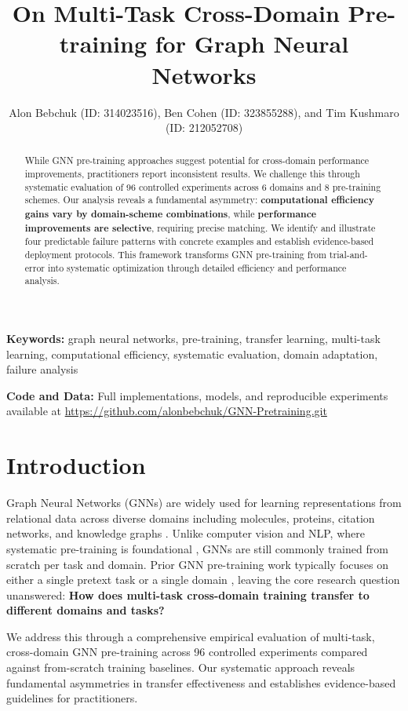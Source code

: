 \documentclass[11pt]{article}
\title{On Multi-Task Cross-Domain Pre-training for Graph Neural Networks}
\author{
  Alon Bebchuk (ID: 314023516), 
  Ben Cohen (ID: 323855288), 
  and Tim Kushmaro (ID: 212052708) \\
}
\begin{document}
\maketitle

\begin{abstract}\normalfont\normalsize
While GNN pre-training approaches suggest potential for cross-domain performance improvements, practitioners report inconsistent results. We challenge this through systematic evaluation of 96 controlled experiments across 6 domains and 8 pre-training schemes. Our analysis reveals a fundamental asymmetry: \textbf{computational efficiency gains vary by domain-scheme combinations}, while \textbf{performance improvements are selective}, requiring precise matching. We identify and illustrate four predictable failure patterns with concrete examples and establish evidence-based deployment protocols. This framework transforms GNN pre-training from trial-and-error into systematic optimization through detailed efficiency and performance analysis.
\end{abstract}

\textbf{Keywords:} graph neural networks, pre-training, transfer learning, multi-task learning, computational efficiency, systematic evaluation, domain adaptation, failure analysis

\textbf{Code and Data:} Full implementations, models, and reproducible experiments available at \url{https://github.com/alonbebchuk/GNN-Pretraining.git}

\section{Introduction}
Graph Neural Networks (GNNs) are widely used for learning representations from relational data across diverse domains including molecules, proteins, citation networks, and knowledge graphs \citep{zhou2020graph}.
Unlike computer vision and NLP, where systematic pre-training is foundational \citep{he2016deep,devlin2019bert}, GNNs are still commonly trained from scratch per task and domain.
Prior GNN pre-training work typically focuses on either a single pretext task or a single domain \citep{hu2019strategies}, leaving the core research question unanswered: \textbf{How does multi-task cross-domain training transfer to different domains and tasks?}

We address this through a comprehensive empirical evaluation of multi-task, cross-domain GNN pre-training across 96 controlled experiments compared against from-scratch training baselines. Our systematic approach reveals fundamental asymmetries in transfer effectiveness and establishes evidence-based guidelines for practitioners.
\end{document}
